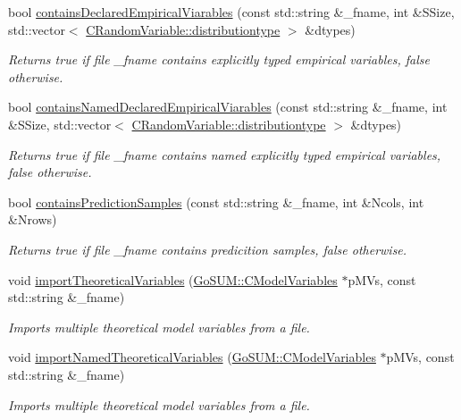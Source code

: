 \begin{DoxyCompactItemize}
bool \hyperlink{class_go_s_u_m_1_1_c_container_a5f12502d4287c8030c4c8d84de8772a6}{contains\-Declared\-Empirical\-Viarables} (const std\-::string \&\-\_\-fname, int \&S\-Size, std\-::vector$<$ \hyperlink{class_c_random_variable_a80d2a87c43847274138b51f7d713d7f1}{C\-Random\-Variable\-::distributiontype} $>$ \&dtypes)
\begin{DoxyCompactList}\small\item\em Returns true if file \-\_\-fname contains explicitly typed empirical variables, false otherwise. \end{DoxyCompactList}\item 
bool \hyperlink{class_go_s_u_m_1_1_c_container_a1a42243bc774adfa6de4490b759698ae}{contains\-Named\-Declared\-Empirical\-Viarables} (const std\-::string \&\-\_\-fname, int \&S\-Size, std\-::vector$<$ \hyperlink{class_c_random_variable_a80d2a87c43847274138b51f7d713d7f1}{C\-Random\-Variable\-::distributiontype} $>$ \&dtypes)
\begin{DoxyCompactList}\small\item\em Returns true if file \-\_\-fname contains named explicitly typed empirical variables, false otherwise. \end{DoxyCompactList}\item 
bool \hyperlink{class_go_s_u_m_1_1_c_container_ae49c3980250b89f49b98a4475368ddf1}{contains\-Prediction\-Samples} (const std\-::string \&\-\_\-fname, int \&Ncols, int \&Nrows)
\begin{DoxyCompactList}\small\item\em Returns true if file \-\_\-fname contains predicition samples, false otherwise. \end{DoxyCompactList}\item 
void \hyperlink{class_go_s_u_m_1_1_c_container_a828fcd476fd8a4e981e33f799111d85f}{import\-Theoretical\-Variables} (\hyperlink{class_go_s_u_m_1_1_c_model_variables}{Go\-S\-U\-M\-::\-C\-Model\-Variables} $\ast$p\-M\-Vs, const std\-::string \&\-\_\-fname)
\begin{DoxyCompactList}\small\item\em Imports multiple theoretical model variables from a file. \end{DoxyCompactList}\item 
void \hyperlink{class_go_s_u_m_1_1_c_container_aae9d5c9892de4672832aff32412611af}{import\-Named\-Theoretical\-Variables} (\hyperlink{class_go_s_u_m_1_1_c_model_variables}{Go\-S\-U\-M\-::\-C\-Model\-Variables} $\ast$p\-M\-Vs, const std\-::string \&\-\_\-fname)
\begin{DoxyCompactList}\small\item\em Imports multiple theoretical model variables from a file. \end{DoxyCompactList}\item 

\end{DoxyCompactItemize}
